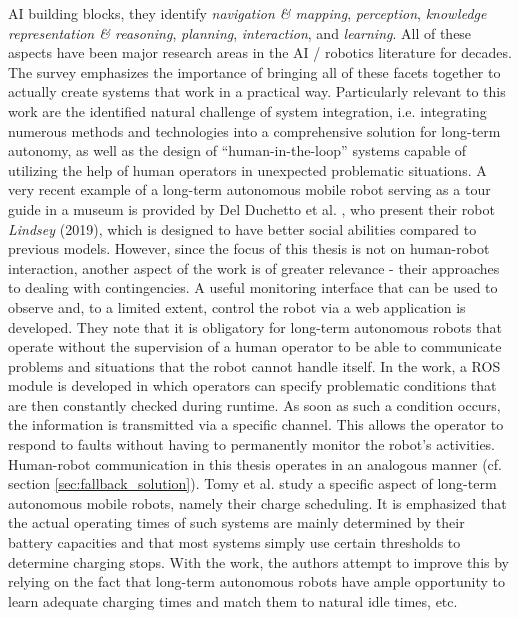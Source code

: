 \documentclass[english, master, utf8]{base/thesis_KBS}
\begin{document}
AI building blocks, they identify \textit{navigation \& mapping}, \textit{perception}, \textit{knowledge representation \& reasoning}, \textit{planning}, \textit{interaction}, and
\textit{learning}. All of these aspects have been major research areas in the AI / robotics literature for decades. The survey emphasizes the importance of bringing all of these
facets together to actually create systems that work in a practical way. Particularly relevant to this work are the identified natural challenge of system integration, i.e.
integrating numerous methods and technologies into a comprehensive solution for long-term autonomy, as well as the design of ``human-in-the-loop'' systems capable of utilizing the
help of human operators in unexpected problematic situations. \cite{Kunze:2018}\newline
A very recent example of a long-term autonomous mobile robot serving as a tour guide in a museum is provided by Del Duchetto et al. \cite{Duchetto:2019}, who present their robot
\textit{Lindsey} (2019), which is designed to have better social abilities compared to previous models. However, since the focus of this thesis is not on human-robot interaction, another aspect of the work is of
greater relevance - their approaches to dealing with contingencies. A useful monitoring interface that can be used to observe and, to a limited extent, control the robot via a web
application is developed. They note that it is obligatory for long-term autonomous robots that operate without the supervision of a human operator to be able to communicate
problems and situations that the robot cannot handle itself. In the work, a ROS module is developed in which operators can specify problematic conditions that are then constantly
checked during runtime. As soon as such a condition occurs, the information is transmitted via a specific channel. This allows the operator to respond to faults without having to
permanently monitor the robot's activities. Human-robot communication in this thesis operates in an analogous manner (cf. section \ref{sec:fallback_solution}).\newline
Tomy et al. \cite{Tomy:2019} study a specific aspect of long-term autonomous mobile robots, namely their charge scheduling. It is emphasized that the actual operating times of
such systems are mainly determined by their battery capacities and that most systems simply use certain thresholds to determine charging stops. With the work, the authors attempt
to improve this by relying on the fact that long-term autonomous robots have ample opportunity to learn adequate charging times and match them to natural idle times, etc.\newline
\end{document}
